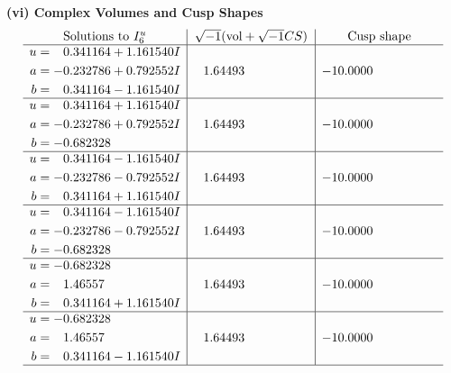 \documentclass[1p]{elsarticle_modified}
\theoremstyle{definition}
\newcommand{\I}{\sqrt{-1}}
\begin{document}
\newpage\flushleft \textbf{(vi) Complex Volumes and Cusp Shapes}
$$\begin{array}{c|c|c}  
\text{Solutions to }I^u_{6}& \I (\text{vol} + \sqrt{-1}CS) & \text{Cusp shape}\\
 \hline 
\begin{aligned}
u &= \phantom{-}0.341164 + 1.161540 I \\
a &= -0.232786 + 0.792552 I \\
b &= \phantom{-}0.341164 - 1.161540 I\end{aligned}
 & \phantom{-}1.64493\phantom{ +0.000000I} & -10.0000\phantom{ +0.000000I} \\ \hline\begin{aligned}
u &= \phantom{-}0.341164 + 1.161540 I \\
a &= -0.232786 + 0.792552 I \\
b &= -0.682328\phantom{ +0.000000I}\end{aligned}
 & \phantom{-}1.64493\phantom{ +0.000000I} & -10.0000\phantom{ +0.000000I} \\ \hline\begin{aligned}
u &= \phantom{-}0.341164 - 1.161540 I \\
a &= -0.232786 - 0.792552 I \\
b &= \phantom{-}0.341164 + 1.161540 I\end{aligned}
 & \phantom{-}1.64493\phantom{ +0.000000I} & -10.0000\phantom{ +0.000000I} \\ \hline\begin{aligned}
u &= \phantom{-}0.341164 - 1.161540 I \\
a &= -0.232786 - 0.792552 I \\
b &= -0.682328\phantom{ +0.000000I}\end{aligned}
 & \phantom{-}1.64493\phantom{ +0.000000I} & -10.0000\phantom{ +0.000000I} \\ \hline\begin{aligned}
u &= -0.682328\phantom{ +0.000000I} \\
a &= \phantom{-}1.46557\phantom{ +0.000000I} \\
b &= \phantom{-}0.341164 + 1.161540 I\end{aligned}
 & \phantom{-}1.64493\phantom{ +0.000000I} & -10.0000\phantom{ +0.000000I} \\ \hline\begin{aligned}
u &= -0.682328\phantom{ +0.000000I} \\
a &= \phantom{-}1.46557\phantom{ +0.000000I} \\
b &= \phantom{-}0.341164 - 1.161540 I\end{aligned}
 & \phantom{-}1.64493\phantom{ +0.000000I} & -10.0000\phantom{ +0.000000I}\\
 \hline 
 \end{array}$$\newpage
\end{document}
